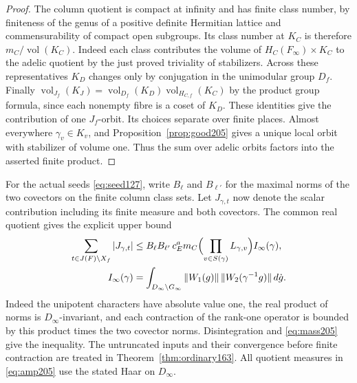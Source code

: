 \documentclass[a4paper,11pt]{article}
\theoremstyle{definition}
\theoremstyle{remark}
\numberwithin{equation}{section}
\begin{document}
\begin{proof}
The column quotient is compact at infinity and has finite class
number, by finiteness of the genus of a positive definite Hermitian
lattice and commensurability of compact open subgroups. Its class
number at \(K_C\) is therefore \(m_C/\operatorname{vol}(K_C)\).
Indeed each class contributes the volume of
\(H_C(F_\infty)\times K_C\) to the adelic quotient by the just
proved triviality of stabilizers. Across these representatives
\(K_D\) changes only by conjugation in the unimodular group \(D_f\).
Finally \(\operatorname{vol}_{J_f}(K_J)=
\operatorname{vol}_{D_f}(K_D)\operatorname{vol}_{H_{C,f}}(K_C)\)
by the product group formula, since each nonempty fibre is a coset
of \(K_D\). These identities give the contribution of one
\(J_f\)-orbit. Its choices separate over finite places. Almost
everywhere \(\gamma_v\in K_v\), and Proposition~\ref{prop:good205}
gives a unique local orbit with stabilizer of volume one. Thus the
sum over adelic orbits factors into the asserted finite product.
\end{proof}

For the actual seeds \eqref{eq:seed127}, write \(B_\ell\) and
\(B_{\ell'}\) for the maximal norms of the two covectors on the
finite column class sets. Let \(J_{\gamma,t}\) now denote the
scalar contribution including its finite measure and both covectors.
The common real quotient gives the explicit upper bound
\begin{align}
 \sum_{t\in J(F)\backslash X_f}|J_{\gamma,t}|
  &\le B_\ell B_{\ell'}\,c_E^a m_C
          \Bigl(\prod_{v\in S(\gamma)}L_{\gamma,v}\Bigr)
          I_\infty(\gamma),                              \label{eq:amp205}\\
 I_\infty(\gamma)
  &=\int_{D_\infty\backslash G_\infty}
       \|W_1(g)\|\,\|W_2(\gamma^{-1}g)\|\,d\dot g .       \notag
\end{align}
Indeed the unipotent characters have absolute value one, the real
product of norms is \(D_\infty\)-invariant, and each contraction of
the rank-one operator is bounded by this product times the two
covector norms. Disintegration and \eqref{eq:mass205} give the
inequality. The untruncated inputs and their convergence before
finite contraction are treated in Theorem~\ref{thm:ordinary163}.
All quotient measures in \eqref{eq:amp205} use the stated Haar on
\(D_\infty\).
\end{document}
